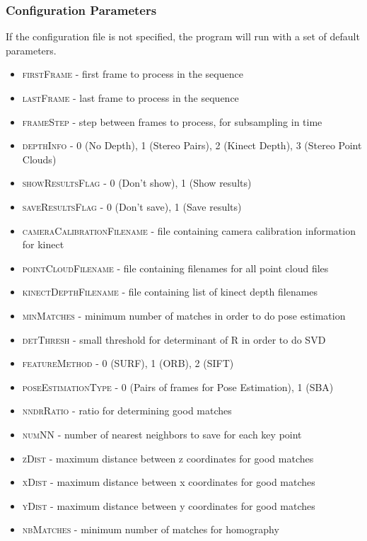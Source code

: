 \subsubsection{Configuration Parameters}
If the configuration file is not specified, the program will run with a set of default parameters.
\begin{itemize}
	\item{\textsc{firstFrame}} - first frame to process in the sequence
	\item{\textsc{lastFrame}} - last frame to process in the sequence
	\item{\textsc{frameStep}} - step between frames to process, for subsampling in time
	\item{\textsc{depthInfo}} - 0 (No Depth), 1 (Stereo Pairs), 2 (Kinect Depth), 3 (Stereo Point Clouds)
	\item{\textsc{showResultsFlag}} - 0 (Don't show), 1 (Show results)
	\item{\textsc{saveResultsFlag}} - 0 (Don't save), 1 (Save results)
	\item{\textsc{cameraCalibrationFilename}} - file containing camera calibration information for kinect
	\item{\textsc{pointCloudFilename}} - file containing filenames for all point cloud files
	\item{\textsc{kinectDepthFilename}} - file containing list of kinect depth filenames
	\item{\textsc{minMatches}} - minimum number of matches in order to do pose estimation
	\item{\textsc{detThresh}} - small threshold for determinant of R in order to do SVD
	\item{\textsc{featureMethod}} - 0 (SURF), 1 (ORB), 2 (SIFT)
	\item{\textsc{poseEstimationType}} - 0 (Pairs of frames for Pose Estimation), 1 (SBA)
	\item{\textsc{nndrRatio}} - ratio for determining good matches
	\item{\textsc{numNN}} - number of nearest neighbors to save for each key point
	\item{\textsc{zDist}} - maximum distance between z coordinates for good matches
	\item{\textsc{xDist}} - maximum distance between x coordinates for good matches
	\item{\textsc{yDist}} - maximum distance between y coordinates for good matches
	\item{\textsc{nbMatches}} - minimum number of matches for homography

\end{itemize}
